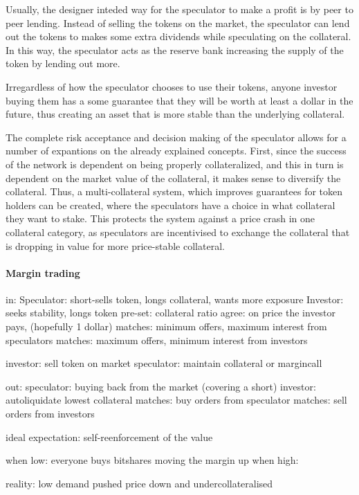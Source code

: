 \documentclass[english,]{IEEEtran}
\let\oldparagraph\paragraph
\renewcommand{\paragraph}[1]{\oldparagraph{#1}\mbox{}}
\begin{document}
Usually, the designer inteded way for the speculator to make a profit is
by peer to peer lending. Instead of selling the tokens on the market,
the speculator can lend out the tokens to makes some extra dividends
while speculating on the collateral. In this way, the speculator acts as
the reserve bank increasing the supply of the token by lending out more.

Irregardless of how the speculator chooses to use their tokens, anyone
investor buying them has a some guarantee that they will be worth at
least a dollar in the future, thus creating an asset that is more stable
than the underlying collateral.

The complete risk acceptance and decision making of the speculator
allows for a number of expantions on the already explained concepts.
First, since the success of the network is dependent on being properly
collateralized, and this in turn is dependent on the market value of the
collateral, it makes sense to diversify the collateral. Thus, a
multi-collateral system, which improves guarantees for token holders can
be created, where the speculators have a choice in what collateral they
want to stake. This protects the system against a price crash in one
collateral category, as speculators are incentivised to exchange the
collateral that is dropping in value for more price-stable collateral.

\hypertarget{margin-trading}{%
\paragraph{Margin trading}\label{margin-trading}}

in: Speculator: short-sells token, longs collateral, wants more exposure
Investor: seeks stability, longs token pre-set: collateral ratio agree:
on price the investor pays, (hopefully 1 dollar) matches: minimum
offers, maximum interest from speculators matches: maximum offers,
minimum interest from investors

investor: sell token on market speculator: maintain collateral or
margincall

out: speculator: buying back from the market (covering a short)
investor: autoliquidate lowest collateral matches: buy orders from
speculator matches: sell orders from investors

ideal expectation: self-reenforcement of the value

when low: everyone buys bitshares moving the margin up when high:

reality: low demand pushed price down and undercollateralised
\end{document}
